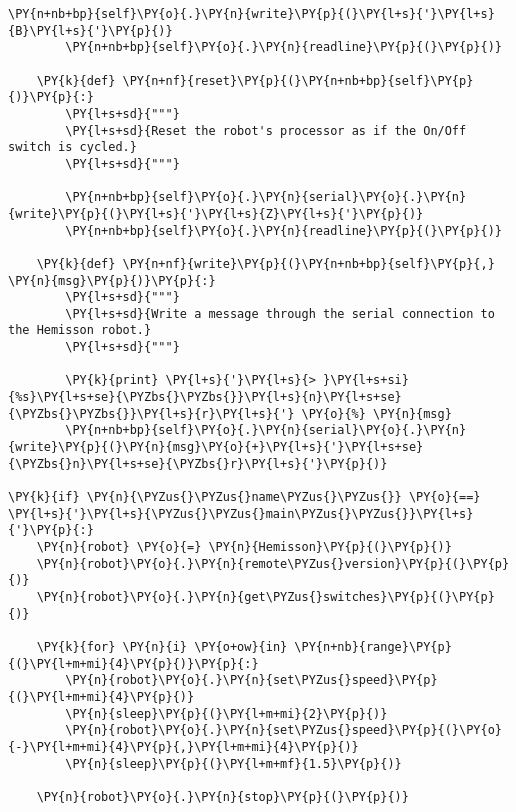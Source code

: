 \begin{Verbatim}[commandchars=\\\{\}]
        \PY{n+nb+bp}{self}\PY{o}{.}\PY{n}{write}\PY{p}{(}\PY{l+s}{'}\PY{l+s}{B}\PY{l+s}{'}\PY{p}{)}
        \PY{n+nb+bp}{self}\PY{o}{.}\PY{n}{readline}\PY{p}{(}\PY{p}{)}

    \PY{k}{def} \PY{n+nf}{reset}\PY{p}{(}\PY{n+nb+bp}{self}\PY{p}{)}\PY{p}{:}
        \PY{l+s+sd}{"""}
        \PY{l+s+sd}{Reset the robot's processor as if the On/Off switch is cycled.}
        \PY{l+s+sd}{"""}

        \PY{n+nb+bp}{self}\PY{o}{.}\PY{n}{serial}\PY{o}{.}\PY{n}{write}\PY{p}{(}\PY{l+s}{'}\PY{l+s}{Z}\PY{l+s}{'}\PY{p}{)}
        \PY{n+nb+bp}{self}\PY{o}{.}\PY{n}{readline}\PY{p}{(}\PY{p}{)}

    \PY{k}{def} \PY{n+nf}{write}\PY{p}{(}\PY{n+nb+bp}{self}\PY{p}{,} \PY{n}{msg}\PY{p}{)}\PY{p}{:}
        \PY{l+s+sd}{"""}
        \PY{l+s+sd}{Write a message through the serial connection to the Hemisson robot.}
        \PY{l+s+sd}{"""}

        \PY{k}{print} \PY{l+s}{'}\PY{l+s}{> }\PY{l+s+si}{%s}\PY{l+s+se}{\PYZbs{}\PYZbs{}}\PY{l+s}{n}\PY{l+s+se}{\PYZbs{}\PYZbs{}}\PY{l+s}{r}\PY{l+s}{'} \PY{o}{%} \PY{n}{msg}
        \PY{n+nb+bp}{self}\PY{o}{.}\PY{n}{serial}\PY{o}{.}\PY{n}{write}\PY{p}{(}\PY{n}{msg}\PY{o}{+}\PY{l+s}{'}\PY{l+s+se}{\PYZbs{}n}\PY{l+s+se}{\PYZbs{}r}\PY{l+s}{'}\PY{p}{)}

\PY{k}{if} \PY{n}{\PYZus{}\PYZus{}name\PYZus{}\PYZus{}} \PY{o}{==} \PY{l+s}{'}\PY{l+s}{\PYZus{}\PYZus{}main\PYZus{}\PYZus{}}\PY{l+s}{'}\PY{p}{:}
    \PY{n}{robot} \PY{o}{=} \PY{n}{Hemisson}\PY{p}{(}\PY{p}{)}
    \PY{n}{robot}\PY{o}{.}\PY{n}{remote\PYZus{}version}\PY{p}{(}\PY{p}{)}
    \PY{n}{robot}\PY{o}{.}\PY{n}{get\PYZus{}switches}\PY{p}{(}\PY{p}{)}

    \PY{k}{for} \PY{n}{i} \PY{o+ow}{in} \PY{n+nb}{range}\PY{p}{(}\PY{l+m+mi}{4}\PY{p}{)}\PY{p}{:}
        \PY{n}{robot}\PY{o}{.}\PY{n}{set\PYZus{}speed}\PY{p}{(}\PY{l+m+mi}{4}\PY{p}{)}
        \PY{n}{sleep}\PY{p}{(}\PY{l+m+mi}{2}\PY{p}{)}
        \PY{n}{robot}\PY{o}{.}\PY{n}{set\PYZus{}speed}\PY{p}{(}\PY{o}{-}\PY{l+m+mi}{4}\PY{p}{,}\PY{l+m+mi}{4}\PY{p}{)}
        \PY{n}{sleep}\PY{p}{(}\PY{l+m+mf}{1.5}\PY{p}{)}

    \PY{n}{robot}\PY{o}{.}\PY{n}{stop}\PY{p}{(}\PY{p}{)}
\end{Verbatim}
